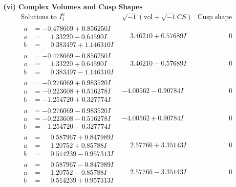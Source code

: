 \documentclass[1p]{elsarticle_modified}
\theoremstyle{definition}
\newcommand{\I}{\sqrt{-1}}
\begin{document}
\newpage\flushleft \textbf{(vi) Complex Volumes and Cusp Shapes}
$$\begin{array}{c|c|c}  
\text{Solutions to }I^u_{1}& \I (\text{vol} + \sqrt{-1}CS) & \text{Cusp shape}\\
 \hline 
\begin{aligned}
u &= -0.478669 + 0.856250 I \\
a &= \phantom{-}1.33220 - 0.64590 I \\
b &= \phantom{-}0.383497 + 1.146310 I\end{aligned}
 & \phantom{-}3.46210 + 0.57689 I & \phantom{-0.000000 } 0 \\ \hline\begin{aligned}
u &= -0.478669 - 0.856250 I \\
a &= \phantom{-}1.33220 + 0.64590 I \\
b &= \phantom{-}0.383497 - 1.146310 I\end{aligned}
 & \phantom{-}3.46210 - 0.57689 I & \phantom{-0.000000 } 0 \\ \hline\begin{aligned}
u &= -0.276069 + 0.983520 I \\
a &= -0.223608 + 0.516278 I \\
b &= -1.254720 + 0.327774 I\end{aligned}
 & -4.00562 - 0.90784 I & \phantom{-0.000000 } 0 \\ \hline\begin{aligned}
u &= -0.276069 - 0.983520 I \\
a &= -0.223608 - 0.516278 I \\
b &= -1.254720 - 0.327774 I\end{aligned}
 & -4.00562 + 0.90784 I & \phantom{-0.000000 } 0 \\ \hline\begin{aligned}
u &= \phantom{-}0.587967 + 0.847989 I \\
a &= \phantom{-}1.20752 + 0.85788 I \\
b &= \phantom{-}0.514239 - 0.957313 I\end{aligned}
 & \phantom{-}2.57766 + 3.35143 I & \phantom{-0.000000 } 0 \\ \hline\begin{aligned}
u &= \phantom{-}0.587967 - 0.847989 I \\
a &= \phantom{-}1.20752 - 0.85788 I \\
b &= \phantom{-}0.514239 + 0.957313 I\end{aligned}
 & \phantom{-}2.57766 - 3.35143 I & \phantom{-0.000000 } 0 \\ \hline\begin{aligned}

\end{aligned}
\end{array}$$
\end{document}
